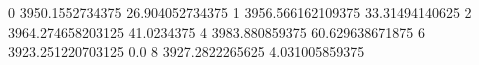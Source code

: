 0 3950.1552734375 26.904052734375
1 3956.566162109375 33.31494140625
2 3964.274658203125 41.0234375
4 3983.880859375 60.629638671875
6 3923.251220703125 0.0
8 3927.2822265625 4.031005859375
